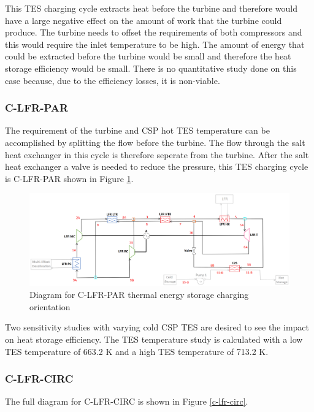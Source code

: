 \begin{paracol}{2}
\linenumbers
\switchcolumn

This TES charging cycle extracts heat before the turbine and therefore would have a large negative effect on the amount of work that the turbine could produce. The turbine needs to offset the requirements of both compressors and this would require the inlet temperature to be high. The amount of energy that could be extracted before the turbine would be small and therefore the heat storage efficiency would be small. There is no quantitative study done on this case because, due to the efficiency losses, it is non-viable. 

\subsubsection{C-LFR-PAR} 

The requirement of the turbine and CSP hot TES temperature can be accomplished by splitting the flow before the turbine. The flow through the salt heat exchanger in this cycle is therefore seperate from the turbine. After the salt heat exchanger a valve is needed to reduce the pressure, this TES charging cycle is C-LFR-PAR shown in Figure \ref{c-lfr-par}.

\end{paracol}
\begin{figure}[H]
    \widefigure
    \includegraphics[width=\linewidth]{Definitions/c-lfr-par.pdf}
    \caption{Diagram for C-LFR-PAR thermal energy storage charging orientation\label{c-lfr-par}}
\end{figure}
\begin{paracol}{2}
\linenumbers
\switchcolumn

Two sensitivity studies with varying cold CSP TES are desired to see the impact on heat storage efficiency. The TES temperature study is calculated with a low TES temperature of 663.2 K and a high TES temperature of 713.2 K. 

\subsubsection{C-LFR-CIRC} 

The full diagram for C-LFR-CIRC is shown in Figure \ref{c-lfr-circ}.

\end{paracol}

